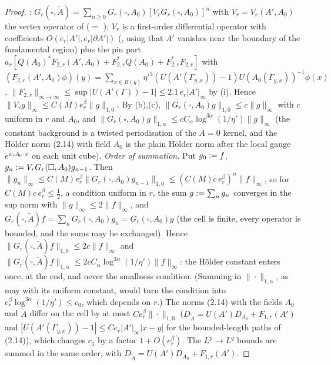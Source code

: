 \begin{proof}
\cite[(2.24)--(2.26), (2.31)--(2.33)]{Ba4}: $G_r(\square,\tilde A)=\sum_{n\ge0}G_r(\square,A_0)[V_rG_r(\square,A_0)]^n$ with $V_r=V_r(A',A_0)$ the vertex operator of \cite[(3.16)]{Ba1} ($=$ \cite[(3.53)]{K1}); $V_r$ is a first-order differential operator with coefficients $O(e_r|A'|,e_r|\partial A'|)$ (\cite[(2.32)]{Ba4}, using that $A'$ vanishes near the boundary of the fundamental region) plus the pin part $a_r[Q(A_0)^*F_{2,r}(A',A_0)+F_{2,r}^*Q(A_0)+F_{2,r}^*F_{2,r}]$ with $(F_{2,r}(A',A_0)\phi)(y)=\sum_{x\in B(y)}\eta'^3(U(A'(\Gamma_{y,x}))-1)U(A_0(\Gamma_{y,x}))^{-1}\phi(x)$, $\|F_{2,r}\|_{\infty\to\infty}\le\sup|U(A'(\Gamma))-1|\le2.1\,e_r|A'|_\infty$ by (i). Hence $\|V_rg\|_\infty\le C(M)e_r^\beta\|g\|_{1,0}$. By (b),(c), $\|G_r(\square,A_0)g\|_{1,0}\le c\|g\|_\infty$ with $c$ uniform in $r$ and $A_0$, and $\|G_r(\square,A_0)g\|_{1,\alpha}\le cC_\alpha\log^{3\alpha}(1/\eta')\|g\|_\infty$ (the constant background is a twisted periodisation of the $A=0$ kernel, and the H\"older norm (2.14) with field $A_0$ is the plain H\"older norm after the local gauge $e^{\mathrm ie_rA_0\cdot x}$ on each unit cube). \emph{Order of summation.} Put $g_0:= f$, $g_n:= V_rG_r(\square,A_0)g_{n-1}$. Then $\|g_n\|_\infty\le C(M)e_r^\beta\|G_r(\square,A_0)g_{n-1}\|_{1,0}\le(C(M)c\,e_r^\beta)^n\|f\|_\infty$, so for $C(M)c\,e_r^\beta\le\frac12$, a condition uniform in $r$, the sum $g:=\sum_ng_n$ converges in the sup norm with $\|g\|_\infty\le2\|f\|_\infty$, and $G_r(\square,\tilde A)f=\sum_nG_r(\square,A_0)g_n=G_r(\square,A_0)g$ (the cell is finite, every operator is bounded, and the sums may be exchanged). Hence $\|G_r(\square,\tilde A)f\|_{1,0}\le2c\|f\|_\infty$ and $\|G_r(\square,\tilde A)f\|_{1,\alpha}\le2cC_\alpha\log^{3\alpha}(1/\eta')\|f\|_\infty$: the H\"older constant enters once, at the end, and never the smallness condition. (Summing in $\|\cdot\|_{1,\alpha}$, as \cite[(2.33)]{Ba4} may with its uniform constant, would turn the condition into $e_r^\beta\log^{3\alpha}(1/\eta')\le c_0$, which depends on $r$.) The norms (2.14) with the fields $A_0$ and $\tilde A$ differ on the cell by at most $Ce_r^\beta\|\cdot\|_{1,0}$ ($D_{\tilde A}=U(A')D_{A_0}+F_{1,r}(A')$ and $|U(A'(\Gamma_{y,x}))-1|\le Ce_r|A'|_\infty|x-y|$ for the bounded-length paths of (2.14)), which changes $c_1$ by a factor $1+O(e_r^\beta)$. The $L^p\to L^q$ bounds are summed in the same order, with $D_{\tilde A}=U(A')D_{A_0}+F_{1,r}(A')$.
\end{proof}

